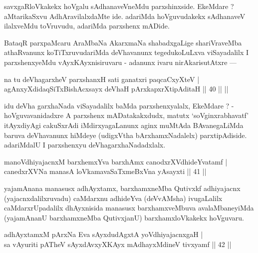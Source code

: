 \begin{artha}
savxgaRloVkakekx hoVgalu sAdhanaveVneMdu parxshinxside. EkeMdare ? aMtarikaSxvu AdhAravilalxdaMte ide. adariMda hoVguvudakekx sAdhanaveV ilalxveMdu toVruvudu, adariMda parxshenx mADide.
\end{artha}

\begin{artha}
BataqR parxpaMcaru AraMbaNa AkarxmaNa shabadxgaLige shariVraveMba athaRvanunx koTiTxruvudariMda deVhavanunx tegedukoLuLxva viSayadalilx I parxshenxyeMdu vAyxKAyxnisiruvaru - adanunx ivaru nirAkarisutAtxre ---
\end{artha}


\begin{shl}
na tu deVhagarxheV parxshanxH sati ganatxri paqcaCxyXteV |\\
agAnxyXdidaqSiTxBishAcxsayx deVhaH pArxkapxrXtipAditaH \hfill || 40 \hfill || ||
\end{shl}

\begin{artha}
idu deVha garxhaNada viSayadalilx baMda parxshenxyalalx, EkeMdare ? - hoVguvavanidadxre A parxshenx mADatakakxdudx, matutx `soV\s ginxrabhavatf' itAyxdiyAgi cakuSxrAdi iMdirxyagaLanunx aginx muMtAda BAvanegaLiMda baruva deVhavanunx hiMdeye (udigxVtha bArxhamxNadalelx) parxtipAdiside. adariMdalU I parxshenxyu deVhagarxhaNadadxlalx.
\end{artha}


\begin{shl}
manoV\s dhiyajacnxM barxhemxYva barxhAmx canodxrXV\s dhideYvatamf |\\
canedxrXVNa manasA loVkamavaSaTxmeBxVna yAsayxti \hfill || 41 || 
\end{shl}

\begin{artha}
yajamAnana manasusx adhAyxtamx, barxhamxneMba Qutivxkf adhiyajacnx (yajacnxdalilx\-ruvadu) caMdarxnu adhideYva (deVvAMsha) ivugaLalilx caMdarxrUpadalilx dhAyxnisida manasusx barxhamxveMbuva avalaMbaneyiMda (yajamAnanU barxhamxneMba QutivxjanU) barxhamxloVkakekx hoVguvaru.
\end{artha}

\begin{shl}
adhAyxtamxM pArxNa Eva sAyxdudAgxtA yoV\s dhiyajacnxgaH |\\
sa vAyuriti pATheV sAyxdAvxyXKAyx mAdhayxMdineV tivxyamf \hfill || 42 ||
\end{shl}

